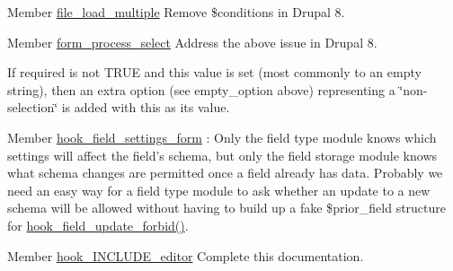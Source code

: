 \begin{DoxyDescription}
\item[Member \hyperlink{group__file_ga32afa29695b6da3f5d86cad18f063bfc}{file\_\-load\_\-multiple} ]Remove \$conditions in Drupal 8.


\end{DoxyDescription}

\label{todo__todo000006}
\hypertarget{todo__todo000006}{}
 
\begin{DoxyDescription}
\item[Member \hyperlink{group__form__api_ga1a2156b4aa18f567264d8c7aafd85dca}{form\_\-process\_\-select} ]Address the above issue in Drupal 8.
\begin{DoxyItemize}
\item If required is not TRUE and this value is set (most commonly to an empty string), then an extra option (see empty\_\-option above) representing a \char`\"{}non-\/selection\char`\"{} is added with this as its value.
\end{DoxyItemize}


\end{DoxyDescription}

\label{todo__todo000015}
\hypertarget{todo__todo000015}{}
 
\begin{DoxyDescription}
\item[Member \hyperlink{group__field__types_gab8a2ed808857cc6f3cb661fbc99d30d4}{hook\_\-field\_\-settings\_\-form} ]: Only the field type module knows which settings will affect the field's schema, but only the field storage module knows what schema changes are permitted once a field already has data. Probably we need an easy way for a field type module to ask whether an update to a new schema will be allowed without having to build up a fake \$prior\_\-field structure for \hyperlink{group__field__crud_ga7bd0ccd40a9a3690b697b68d03f660a4}{hook\_\-field\_\-update\_\-forbid()}.


\end{DoxyDescription}

\label{todo__todo000092}
\hypertarget{todo__todo000092}{}
 
\begin{DoxyDescription}
\item[Member \hyperlink{wysiwyg_8api_8php_ad3605f8cb948779e59e72c711a7ff843}{hook\_\-INCLUDE\_\-editor} ]Complete this documentation. 
\end{DoxyDescription}

